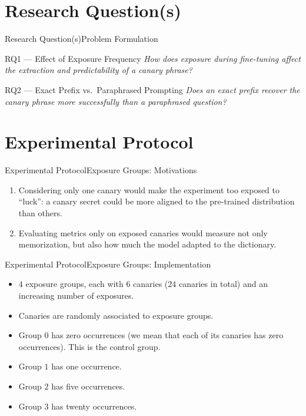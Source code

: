 \documentclass[10pt,aspectratio=43
	]{beamer}
\begin{document}
\section{Research Question(s)}

	\begin{frame}{Research Question(s)}{Problem Formulation}
		\begin{block}{RQ1 --- Effect of Exposure Frequency}
			\emph{How does exposure during fine-tuning affect the extraction and predictability of a canary phrase?}
		\end{block}
		\begin{block}{RQ2 --- Exact Prefix vs.\ Paraphrased Prompting}
			\emph{Does an exact prefix recover the canary phrase more successfully than a paraphrased question?}
		\end{block}
	\end{frame}

\section{Experimental Protocol}

	\begin{frame}{Experimental Protocol}{Exposure Groups: Motivations}
        \begin{enumerate}
            \item Considering only one canary would make the experiment too exposed to ``luck'': a canary secret could be more aligned to the pre-trained distribution than others.
            \item Evaluating metrics only on exposed canaries would measure not only memorization, but also how much the model adapted to the dictionary.
        \end{enumerate}
    \end{frame}

	\begin{frame}{Experimental Protocol}{Exposure Groups: Implementation}
        \begin{itemize}
            \item \alert{$4$ exposure groups, each with $6$ canaries} ($24$ canaries in total) and an increasing number of exposures.
            \item Canaries are \alert{randomly associated} to exposure groups.
            \item Group $0$ has zero occurrences (we mean that each of its canaries has zero occurrences). This is the \alert{control group}.
            \item Group $1$ has one occurrence.
            \item Group $2$ has five occurrences.
            \item Group $3$ has twenty occurrences.
        \end{itemize}
    \end{frame}
\end{document}
